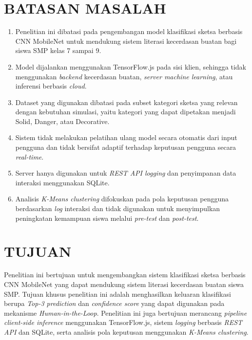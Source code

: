 \documentclass[12pt,a4paper,oneside,openany]{report}
\begin{document}
\section{BATASAN MASALAH}
\label{sec:batasan-masalah}

\begin{enumerate}
    \item Penelitian ini dibatasi pada pengembangan model klasifikasi sketsa berbasis CNN MobileNet untuk mendukung sistem literasi kecerdasan buatan bagi siswa SMP kelas 7 sampai 9.
    \item Model dijalankan menggunakan TensorFlow.js pada sisi klien, sehingga tidak menggunakan \textit{backend} kecerdasan buatan, \textit{server machine learning}, atau inferensi berbasis \textit{cloud}.
    \item Dataset yang digunakan dibatasi pada subset kategori sketsa yang relevan dengan kebutuhan simulasi, yaitu kategori yang dapat dipetakan menjadi Solid, Danger, atau Decorative.
    \item Sistem tidak melakukan pelatihan ulang model secara otomatis dari input pengguna dan tidak bersifat adaptif terhadap keputusan pengguna secara \textit{real-time}.
    \item Server hanya digunakan untuk \textit{REST API logging} dan penyimpanan data interaksi menggunakan SQLite.
    \item Analisis \textit{K-Means clustering} difokuskan pada pola keputusan pengguna berdasarkan \textit{log} interaksi dan tidak digunakan untuk menyimpulkan peningkatan kemampuan siswa melalui \textit{pre-test} dan \textit{post-test}.
\end{enumerate}

\section{TUJUAN}
\label{sec:tujuan}

Penelitian ini bertujuan untuk mengembangkan sistem klasifikasi sketsa berbasis CNN MobileNet yang dapat mendukung sistem literasi kecerdasan buatan siswa SMP. Tujuan khusus penelitian ini adalah menghasilkan keluaran klasifikasi berupa \textit{Top-3 prediction} dan \textit{confidence score} yang dapat digunakan pada mekanisme \textit{Human-in-the-Loop}. Penelitian ini juga bertujuan merancang \textit{pipeline client-side inference} menggunakan TensorFlow.js, sistem \textit{logging} berbasis \textit{REST API} dan SQLite, serta analisis pola keputusan menggunakan \textit{K-Means clustering}.
\end{document}
